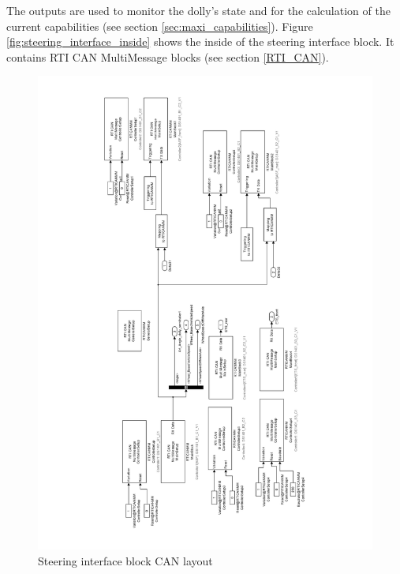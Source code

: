 \documentclass[ExampleMasters.tex]{subfiles}
\begin{document}
 The outputs are used to monitor the dolly's state and for the calculation of the current capabilities (see section \ref{sec:maxi_capabilities}).
 Figure \ref{fig:steering_interface_inside} shows the inside of the steering interface block. It contains RTI CAN MultiMessage blocks (see section \ref{RTI_CAN}).   
 
 \begin{figure}[h]
 	\centering
 	\includegraphics[width=1\linewidth]{figures/steering_interface_inside}
 	
 	\caption{Steering interface block CAN layout}
 	\label{fig:steering_interface_inside_pdf}
 \end{figure} \\
 
\end{document}
